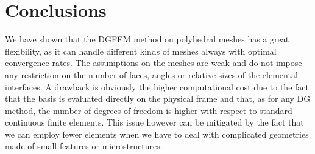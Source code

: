\documentclass[12pt, a4paper]{article}
\theoremstyle{definition}
\theoremstyle{plain}
\theoremstyle{plain}
\theoremstyle{definition}
\begin{document}
\section{Conclusions}\label{sec:conc}
We have shown that the DGFEM method on polyhedral meshes has a great 
flexibility, as it can handle different kinds of meshes always with 
optimal convergence rates. The assumptions on the meshes are weak and do not 
impose any restriction on the number of faces, angles or relative sizes of the 
elemental interfaces. A drawback is obviously the higher computational cost due 
to the fact that the basis is evaluated directly on the 
physical frame and that, as for any DG method, the number of degrees of 
freedom is higher with respect to standard continuous finite elements. This 
issue however can be mitigated by the fact that we can employ fewer elements 
when we have to deal with complicated geometries made of small features or 
microstructures.\\
\end{document}
